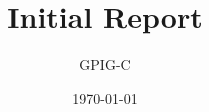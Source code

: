 \documentclass[10pt,a4paper]{article}
\begin{document}
\title{Initial Report}
\author{GPIG-C}
\date{\today}
\maketitle
\end{document}
